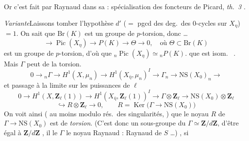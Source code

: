 \documentclass[11pt,a4paper]{article}
\begin{document}
Or c'est fait par Raynaud dans sa  : spécialisation des
foncteurs de Picard, \emph{th.~3} \ill{} \ill{}  \ill{} \ill{}
. \struck{\ill{}}

\emph{Variante}\quad Laissons tomber l'hypothèse $d'$ ($=$ pgcd des deg.\ des
$0$-cycles sur $X_\eta$) $= 1$.
On sait que $\mathrm{Br}(K)$ est un groupe de $p$-torsion, donc \ldots
\[
\to \operatorname{Pic}(X_\eta) \to P(K) \to \Theta \to 0 , \quad \text{où }
\Theta \subset \mathrm{Br}(K)
\]
est un groupe de $p$-torsion, d'où  que
${}_n\operatorname{Pic}(X_\eta) \simeq {}_nP(K)$. \ill{} \ill{} \ill{} \ill{} que
\ill{} est isom.\  \ill{}. Mais $\Gamma$ peut  de
la torsion. \ill{} 
\[
0 \to {}_n\Gamma \to H^1(X, \mu_n) \to H^1(X_{\bar\eta}, \mu_n)^I \to
\Gamma_n \to \mathrm{NS}(X_0)_n \to
\]
 et  passage à la limite sur les puissances de
$\ell$
\[
0 \to H^1(X, \mathbf{Z}_\ell(1)) \to H^1(X_{\bar\eta}, \mathbf{Z}_\ell(1))^I
\to \Gamma \otimes \mathbf{Z}_\ell \to \mathrm{NS}(X_0) \otimes \mathbf{Z}_\ell
\]
\[
\hookrightarrow R \otimes \mathbf{Z}_\ell \to 0 , \qquad R = \operatorname{Ker}
\bigl(\Gamma \to \mathrm{NS}(X_0)\bigr)
\]
On voit ainsi (\ill{} au moins modulo rés.\ des singularités, 
\ill{} \ill{} \ill{} \ill{} \ill{}) que le noyau $R$ de $\Gamma \to
\mathrm{NS}(X_0)$ est de \emph{torsion}. \struck{\ill{} \ill{} \ill{} \ill{}
\ill{} \ill{}}
\struck{\ill{}} (C'est donc un sous-groupe du  $\Gamma \simeq
\mathbf{Z}/d\mathbf{Z}$, \ill{} \ill{}  
d'être égal à $\mathbf{Z}/d\mathbf{Z}$ \ill{} \ill{}, \ill{} \ill{} \ill{} il le
 \ill{}  $\Gamma$ \ill{} \ill{} \ill{} le
noyau \ill{} \ill{} Raynaud  \ill{} \ill{} : \ill{}
 Raynaud \ill{} \ill{} \ill{} \ill{} de $S$ \ldots)
\ill{} \ill{}, si
\end{document}
